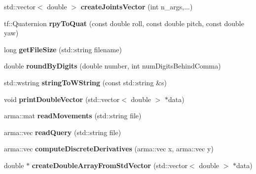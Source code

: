 \begin{DoxyCompactItemize}
\item 
\hypertarget{namespacekukadu_a3252719e8d4e114800a6f2d058a5c005}{std\-::vector$<$ double $>$ {\bfseries create\-Joints\-Vector} (int n\-\_\-args,...)}\label{namespacekukadu_a3252719e8d4e114800a6f2d058a5c005}

\item 
\hypertarget{namespacekukadu_aae572ab857033784dd497034dfaf7dd3}{tf\-::\-Quaternion {\bfseries rpy\-To\-Quat} (const double roll, const double pitch, const double yaw)}\label{namespacekukadu_aae572ab857033784dd497034dfaf7dd3}

\item 
\hypertarget{namespacekukadu_a298b58c8a4f14a525e51794dd0a23d34}{long {\bfseries get\-File\-Size} (std\-::string filename)}\label{namespacekukadu_a298b58c8a4f14a525e51794dd0a23d34}

\item 
\hypertarget{namespacekukadu_a1296de8cc04a6c5b28d47722b6cbdb3f}{double {\bfseries round\-By\-Digits} (double number, int num\-Digits\-Behind\-Comma)}\label{namespacekukadu_a1296de8cc04a6c5b28d47722b6cbdb3f}

\item 
\hypertarget{namespacekukadu_af9fedac63f76b969c8264646b7abd405}{std\-::wstring {\bfseries string\-To\-W\-String} (const std\-::string \&s)}\label{namespacekukadu_af9fedac63f76b969c8264646b7abd405}

\item 
\hypertarget{namespacekukadu_a1de8efd2d11c3184e95d80f0652ec4b3}{void {\bfseries print\-Double\-Vector} (std\-::vector$<$ double $>$ $\ast$data)}\label{namespacekukadu_a1de8efd2d11c3184e95d80f0652ec4b3}

\item 
\hypertarget{namespacekukadu_af3958106c6520fae37b8668a56981a35}{arma\-::mat {\bfseries read\-Movements} (std\-::string file)}\label{namespacekukadu_af3958106c6520fae37b8668a56981a35}

\item 
\hypertarget{namespacekukadu_a6045b5e6eb7c8f49a0cab0e6fb09c129}{arma\-::vec {\bfseries read\-Query} (std\-::string file)}\label{namespacekukadu_a6045b5e6eb7c8f49a0cab0e6fb09c129}

\item 
\hypertarget{namespacekukadu_a624f93fab797148406ed6fc8fb3b27aa}{arma\-::vec {\bfseries compute\-Discrete\-Derivatives} (arma\-::vec x, arma\-::vec y)}\label{namespacekukadu_a624f93fab797148406ed6fc8fb3b27aa}

\item 
\hypertarget{namespacekukadu_a2508a08633bd3cfe5443abeedc7b3736}{double $\ast$ {\bfseries create\-Double\-Array\-From\-Std\-Vector} (std\-::vector$<$ double $>$ $\ast$data)}\label{namespacekukadu_a2508a08633bd3cfe5443abeedc7b3736}


\end{DoxyCompactItemize}
